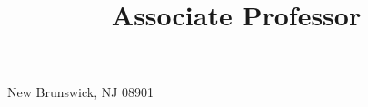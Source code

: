 



\usepackage{url,fancyhdr}

\usepackage{fontspec}
\usepackage{xunicode}
\usepackage{xcolor}

\let\sups\relax
\usepackage{tipa}
\usepackage{multicol}
\usepackage[spanish, english]{babel}
\usepackage{natbib}
\usepackage{bibentry}
\newcommand{\bibverse}[1]{\begin{verse} \bibentry{#1}. \end{verse}}
\usepackage{hanging}
\usepackage{fontawesome5}
\usepackage{academicons}

\usepackage[scale=0.8]{geometry}





\title{Associate Professor}
\address{Rutgers University \\ 
         Department of Spanish and Portuguese}{New Brunswick, NJ 08901}
\def\mytitle{Associate Professor}
\def\myphone{(848) 932-6930}
\def\myskype{casillas.joseph}
\def\myemail{joseph.casillas@rutgers.edu}
\def\myweb{www.jvcasillas.com}
\def\facweb{https://span-port.rutgers.edu/people/faculty/30-personnel/faculty/771-joseph-casillas}
\def\school{Rutgers University}
\def\schoolweb{https://www.arizona.edu}


